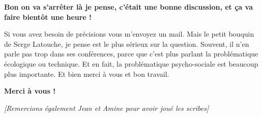 \begin{small}
\vspace{1\baselineskip}

\textbf{Bon on va s’arrêter là je pense, c'était une bonne discussion, et ça va faire bientôt une heure !}

\vspace{1\baselineskip}

Si vous avez besoin de précisions vous m'envoyez un mail. Mais le petit bouquin de Serge Latouche, je pense est le plus sérieux sur la question. Souvent, il n'en parle pas trop dans ses conférences, parce que c'est plus parlant la problématique écologique ou technique. Et en fait, la problématique psycho-sociale est beaucoup plus importante. 
Et bien merci à vous et bon travail.

\vspace{1\baselineskip}

\textbf{Merci à vous !}


\textit{[Remercions également Jean et Amine pour avoir joué les scribes]}

\end{small}